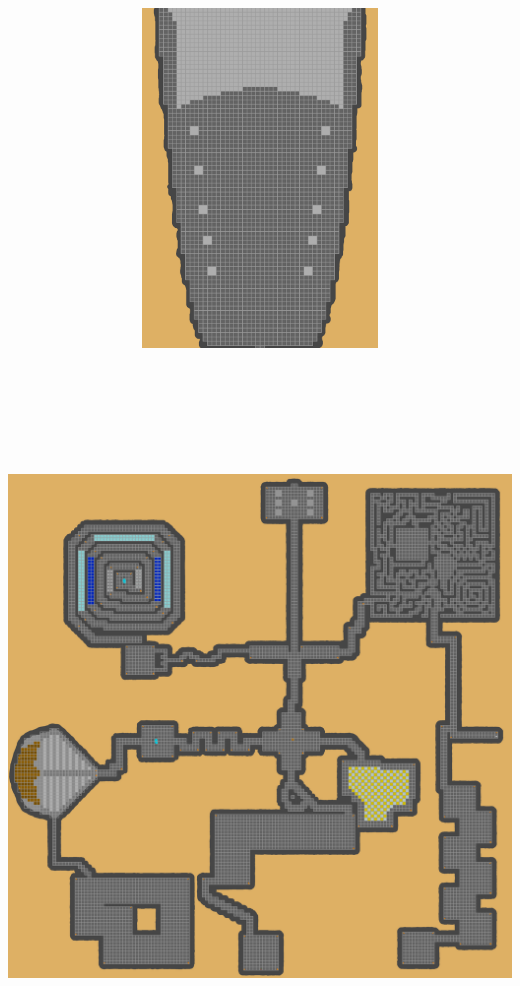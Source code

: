 \documentclass[a4paper, landscape]{article}
\begin{document}
	\begin{figure}
\includegraphics[trim = 862 0 80 2204, clip, height = 9cm, width = 28cm]{Bossroom.png}
	\end{figure}
\clearpage
\includegraphics[trim = 403 4041 3884 429, clip, height = 19cm, width = 28cm]{Dungeon_playersmap.png}
\end{document}
